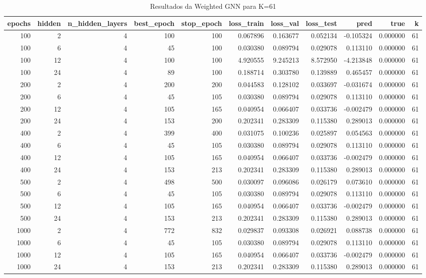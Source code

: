 \begin{table}
\caption{Resultados da Weighted GNN para K=61}
\label{tab:weighted_gnn_results_k61}
\begin{tabular}{rrrrrrrrrrr}
\toprule
epochs & hidden & n\_hidden\_layers & best\_epoch & stop\_epoch & loss\_train & loss\_val & loss\_test & pred & true & k \\
\midrule
100 & 2 & 4 & 100 & 100 & 0.067896 & 0.163677 & 0.052134 & -0.105324 & 0.000000 & 61 \\
100 & 6 & 4 & 45 & 100 & 0.030380 & 0.089794 & 0.029078 & 0.113110 & 0.000000 & 61 \\
100 & 12 & 4 & 100 & 100 & 4.920555 & 9.245213 & 8.572950 & -4.213848 & 0.000000 & 61 \\
100 & 24 & 4 & 89 & 100 & 0.188714 & 0.303780 & 0.139889 & 0.465457 & 0.000000 & 61 \\
200 & 2 & 4 & 200 & 200 & 0.044583 & 0.128102 & 0.033697 & -0.031674 & 0.000000 & 61 \\
200 & 6 & 4 & 45 & 105 & 0.030380 & 0.089794 & 0.029078 & 0.113110 & 0.000000 & 61 \\
200 & 12 & 4 & 105 & 165 & 0.040954 & 0.066407 & 0.033736 & -0.002479 & 0.000000 & 61 \\
200 & 24 & 4 & 153 & 200 & 0.202341 & 0.283309 & 0.115380 & 0.289013 & 0.000000 & 61 \\
400 & 2 & 4 & 399 & 400 & 0.031075 & 0.100236 & 0.025897 & 0.054563 & 0.000000 & 61 \\
400 & 6 & 4 & 45 & 105 & 0.030380 & 0.089794 & 0.029078 & 0.113110 & 0.000000 & 61 \\
400 & 12 & 4 & 105 & 165 & 0.040954 & 0.066407 & 0.033736 & -0.002479 & 0.000000 & 61 \\
400 & 24 & 4 & 153 & 213 & 0.202341 & 0.283309 & 0.115380 & 0.289013 & 0.000000 & 61 \\
500 & 2 & 4 & 498 & 500 & 0.030097 & 0.096086 & 0.026179 & 0.073610 & 0.000000 & 61 \\
500 & 6 & 4 & 45 & 105 & 0.030380 & 0.089794 & 0.029078 & 0.113110 & 0.000000 & 61 \\
500 & 12 & 4 & 105 & 165 & 0.040954 & 0.066407 & 0.033736 & -0.002479 & 0.000000 & 61 \\
500 & 24 & 4 & 153 & 213 & 0.202341 & 0.283309 & 0.115380 & 0.289013 & 0.000000 & 61 \\
1000 & 2 & 4 & 772 & 832 & 0.029837 & 0.093308 & 0.026921 & 0.088738 & 0.000000 & 61 \\
1000 & 6 & 4 & 45 & 105 & 0.030380 & 0.089794 & 0.029078 & 0.113110 & 0.000000 & 61 \\
1000 & 12 & 4 & 105 & 165 & 0.040954 & 0.066407 & 0.033736 & -0.002479 & 0.000000 & 61 \\
1000 & 24 & 4 & 153 & 213 & 0.202341 & 0.283309 & 0.115380 & 0.289013 & 0.000000 & 61 \\
\bottomrule
\end{tabular}
\end{table}
